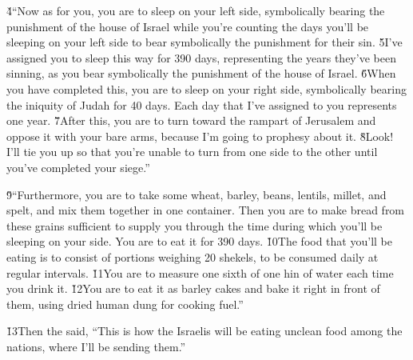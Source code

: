 \v{4}``Now as for you, you are to sleep on your left side, symbolically bearing the punishment of the house of Israel while you're counting the days you'll be sleeping on your left side to bear symbolically the punishment for their sin. \v{5}I've assigned you to sleep this way for 390 days, representing the years they've been sinning, as you bear symbolically the punishment of the house of Israel. \v{6}When you have completed this, you are to sleep on your right side, symbolically bearing the iniquity of Judah for 40 days. Each day that I've assigned to you represents one year. \v{7}After this, you are to turn toward the rampart of Jerusalem and oppose it with your bare arms, because I'm going to prophesy about it. \v{8}Look! I'll tie you up so that you're unable to turn from one side to the other until you've completed your siege.''

\v{9}``Furthermore, you are to take some wheat, barley, beans, lentils, millet, and spelt, and mix them together in one container. Then you are to make bread from these grains sufficient to supply you through the time during which you'll be sleeping on your side. You are to eat it for 390 days. \v{10}The food that you'll be eating is to consist of portions weighing 20 shekels, to be consumed daily at regular intervals. \v{11}You are to measure one sixth of one hin of water each time you drink it. \v{12}You are to eat it as barley cakes and bake it right in front of them, using dried human dung for cooking fuel.''

\v{13}Then the  said, ``This is how the Israelis will be eating unclean food among the nations, where I'll be sending them.''

